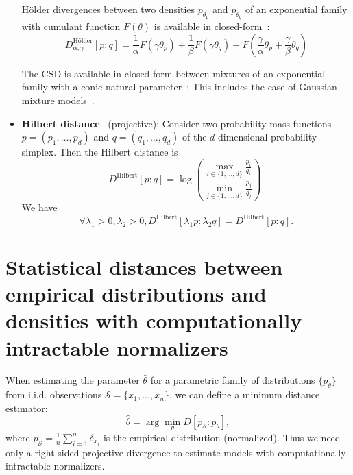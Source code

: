 \documentclass[11pt]{article}
\def\calS{\mathcal{S}}
\begin{document}
\begin{itemize}
H\"older divergences between two densities $p_{\theta_p}$ and $p_{\theta_q}$ of an exponential family with cumulant function $F(\theta)$ is available in closed-form~\cite{HolderDivergence-2017}:
$$
D_{\alpha, \gamma}^{\mbox{H\"older}}[p:q]=\frac{1}{\alpha} F\left(\gamma \theta_{p}\right)+\frac{1}{\beta} F\left(\gamma \theta_{q}\right)-F\left(\frac{\gamma}{\alpha} \theta_{p}+\frac{\gamma}{\beta} \theta_{q}\right)
$$


The CSD is available in closed-form between mixtures of an exponential family with a conic natural parameter~\cite{nielsen2012closed}: This includes the case of Gaussian mixture models~\cite{kampa2011closed}.

\item {\bf Hilbert distance}~\cite{nielsen2019clustering} (projective): Consider two probability mass functions $p=(p_1,\ldots, p_d)$ and $q=(q_1,\ldots,q_d)$ of the $d$-dimensional probability simplex. Then the Hilbert distance is
$$
D^{\mbox{Hilbert}}[p:q]=\log \left( \frac{\max _{i\in\{1,\ldots, d\}} \frac{p_{i}}{q_{i}}}{\min _{j\in\{1,\ldots, d\}} \frac{p_{j}}{q_{j}}}\right).
$$
We have 
$$
\forall \lambda_1>0, \lambda_2>0, D^{\mbox{Hilbert}}[\lambda_1 p:\lambda_2 q]= D^{\mbox{Hilbert}}[p:q].
$$


\end{itemize}


\section{Statistical distances between empirical distributions and densities with computationally intractable normalizers}

When estimating the parameter $\hat\theta$ for a parametric family of distributions $\{p_\theta\}$ from i.i.d. observations $\calS=\{x_1,\ldots,x_n\}$, we can define a minimum distance estimator:
$$
\hat\theta=\arg\min_\theta D[p_\calS:p_\theta],
$$
where $p_\calS=\frac{1}{n}\sum_{i=1}^n \delta_{x_i}$ is the empirical distribution (normalized).
Thus we need only a right-sided projective divergence to estimate models with computationally intractable normalizers.
\end{document}
